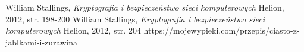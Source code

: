 \documentclass[12pt, letterpaper, titlepage]{article}
\begin{document}
\begin{thebibliography}{9}
William Stallings,
\textit{Kryptografia i bezpieczeństwo sieci komputerowych}
Helion, 2012, str. 198-200
William Stallings,
\textit{Kryptografia i bezpieczeństwo sieci komputerowych}
Helion, 2012, str. 204
https://mojewypieki.com/przepis/ciasto-z-jablkami-i-zurawina
\end{thebibliography}
\end{document}
